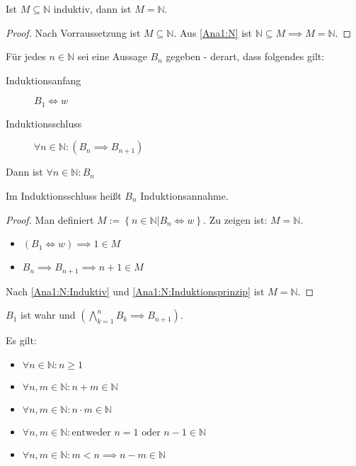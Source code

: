 \begin{theorem}[Induktionsprinzip]\label{Ana1:N:Induktionsprinzip}
  Ist $M \subseteq \mathbb{N}$ induktiv, dann ist $M = \mathbb{N}$.
\end{theorem}
\begin{proof}
  Nach Vorraussetzung ist $M \subseteq \mathbb{N}$. Aus \ref{Ana1:N} ist $\mathbb{N} \subseteq M \implies M = \mathbb{N}$.
\end{proof}
\begin{theorem}[Induktionsbeweis]
  Für jedes $n \in \mathbb{N}$ sei eine Aussage $B_n$ gegeben - derart, dass folgendes gilt:
  \begin{description}
  \item[Induktionsanfang] $B_1 \iff w$
  \item[Induktionsschluss] $\forall n \in \mathbb{N}: (B_n \implies B_{n+1})$
  \end{description}
  Dann ist $\forall n \in \mathbb{N}: B_n$
\end{theorem}
\begin{remark}
  Im Induktionsschluss heißt $B_n$ Induktionsannahme.
\end{remark}
\begin{proof}
  Man definiert $M := \left\{ n \in \mathbb{N} | B_n \iff w \right\}$. Zu zeigen ist: $M = \mathbb{N}$.
  \begin{itemize}
  \item $(B_1 \iff w) \implies 1 \in M$
  \item $B_n \implies B_{n+1} \implies n+1 \in M$
  \end{itemize}
  Nach \ref{Ana1:N:Induktiv} und \ref{Ana1:N:Induktionsprinzip} ist $M = \mathbb{N}$.
\end{proof}
\begin{remark}
  $B_1$ ist wahr und $\left( \bigwedge_{k=1}^n B_k \implies B_{n+1} \right)$.
\end{remark}

\begin{theorem}
  Es gilt:
  \begin{itemize}
  \item $\forall n \in \mathbb{N}: n \ge 1$
  \item $\forall n, m \in \mathbb{N}: n+m \in \mathbb{N}$
  \item $\forall n, m \in \mathbb{N}: n \cdot m \in \mathbb{N}$
  \item $\forall n, m \in \mathbb{N}: \text{entweder } n = 1 \text{ oder } n-1 \in \mathbb{N}$
  \item $\forall n, m \in \mathbb{N}: m < n \implies n - m \in \mathbb{N}$
  \end{itemize}
\end{theorem}

